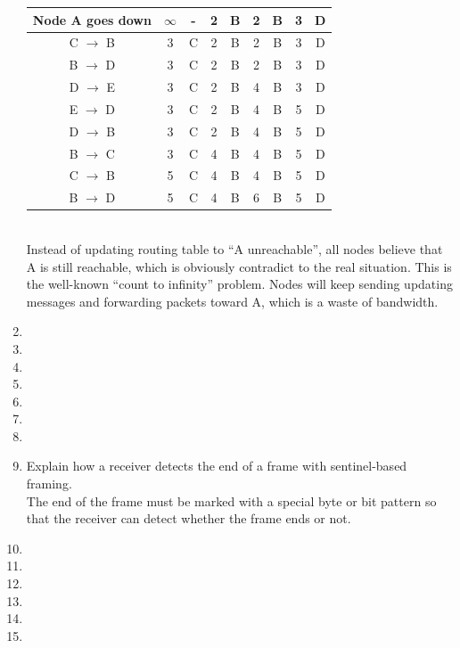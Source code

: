 \documentclass[10pt, a4paper]{article}
\begin{document}
\begin{enumerate}
\begin{tabular}{|c|c|c|c|c|c|c|c|c|}
        \hline
        Node A goes down & $\infty$ & - & 2 & B & 2 & B & 3 & D \\
        \hline
        C $\rightarrow$ B & 3 & C & 2 & B & 2 & B & 3 & D \\
        \hline
        B $\rightarrow$ D & 3 & C & 2 & B & 2 & B & 3 & D \\
        \hline
        D $\rightarrow$ E & 3 & C & 2 & B & 4 & B & 3 & D \\
        \hline
        E $\rightarrow$ D & 3 & C & 2 & B & 4 & B & 5 & D \\
        \hline
        D $\rightarrow$ B & 3 & C & 2 & B & 4 & B & 5 & D \\
        \hline
        B $\rightarrow$ C & 3 & C & 4 & B & 4 & B & 5 & D \\
        \hline
        C $\rightarrow$ B & 5 & C & 4 & B & 4 & B & 5 & D \\
        \hline
        B $\rightarrow$ D & 5 & C & 4 & B & 6 & B & 5 & D \\
        \hline
    \end{tabular}\\
    Instead of updating routing table to ``A unreachable'', all nodes believe that A is still reachable, which is obviously contradict to the real situation. This is the well-known ``count to infinity'' problem. Nodes will keep sending updating messages and forwarding packets toward A, which is a waste of bandwidth.
    \color{black}
\item\mbox{}
\item\mbox{}
\item\mbox{}
\item\mbox{}
\item\mbox{}
\item\mbox{}
\item\mbox{}
\item\mbox{} Explain how a receiver detects the end of a frame with sentinel-based framing.\\
    \color{blue}
    The end of the frame must be marked with a special byte or bit pattern so that the receiver can detect whether the frame ends or not.
    \color{black}
\item\mbox{}
\item\mbox{}
\item\mbox{}
\item\mbox{}
\item\mbox{}
\item\mbox{}

\end{enumerate}
\end{document}
